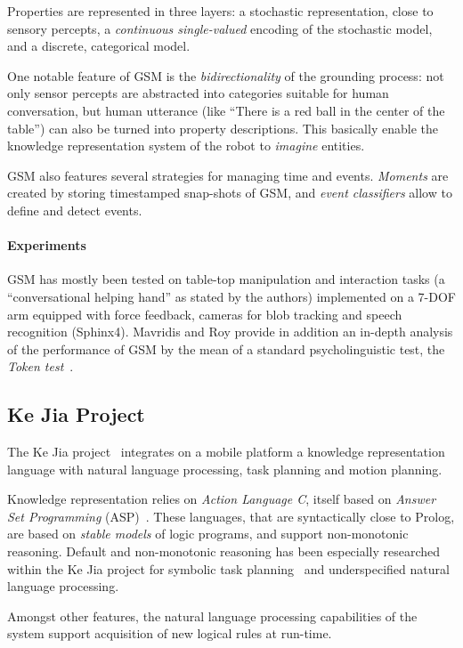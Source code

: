 \documentclass{IEEEtran}
\begin{document}
Properties are represented in three layers: a stochastic representation, close
to sensory percepts, a \emph{continuous single-valued} encoding of the
stochastic model, and a discrete, categorical model.

One notable feature of GSM is the \emph{bidirectionality} of the grounding
process: not only sensor percepts are abstracted into categories suitable for
human conversation, but human utterance (like ``There is a red ball in the
center of the table'') can also be turned into property descriptions. This
basically enable the knowledge representation system of the robot to
\emph{imagine} entities.

GSM also features several strategies for managing time and events.
\emph{Moments} are created by storing timestamped snap-shots of GSM, and
\emph{event classifiers} allow to define and detect events.

\paragraph{Experiments} GSM has mostly been tested on table-top manipulation
and interaction tasks (a ``conversational helping hand'' as stated by the
authors) implemented on a 7-DOF arm equipped with force feedback, cameras for blob
tracking and speech recognition (Sphinx4). Mavridis and Roy provide in addition
an in-depth analysis of the performance of GSM by the mean of a standard
psycholinguistic test, the \emph{Token test}~\cite{DiSimoni1978}.

\subsection{Ke Jia Project}
\label{sect|kejia}

The Ke Jia project~\cite{Chen2010} integrates on a mobile platform a knowledge
representation language with natural language processing, task planning and
motion planning.

Knowledge representation relies on \emph{Action Language C}, itself based on
\emph{Answer Set Programming} (ASP)~\cite{Gelfond2008}. These languages, that
are syntactically close to Prolog, are based on \emph{stable models} of logic
programs, and support non-monotonic reasoning. Default and non-monotonic
reasoning has been especially researched within the Ke Jia project for symbolic
task planning~\cite{Ji2011} and underspecified natural language processing.

Amongst other features, the natural language processing capabilities of the
system support acquisition of new logical rules at run-time.
\end{document}
